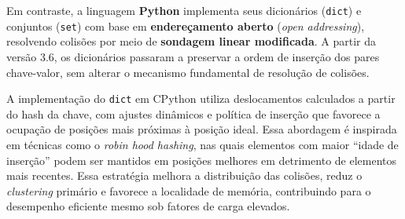 Em contraste, a linguagem \textbf{Python} implementa seus dicionários (\texttt{dict}) e conjuntos (\texttt{set}) com base em \textbf{endereçamento aberto} (\textit{open addressing}), resolvendo colisões por meio de \textbf{sondagem linear modificada}. 
A partir da versão 3.6, os dicionários passaram a preservar a ordem de inserção dos pares chave-valor, sem alterar o mecanismo fundamental de resolução de colisões.

A implementação do \texttt{dict} em CPython utiliza deslocamentos calculados a partir do hash da chave, com ajustes dinâmicos e política de inserção que favorece a ocupação de posições mais próximas à posição ideal. 
Essa abordagem é inspirada em técnicas como o \textit{robin hood hashing}, nas quais elementos com maior ``idade de inserção'' podem ser mantidos em posições melhores em detrimento de elementos mais recentes. 
Essa estratégia melhora a distribuição das colisões, reduz o \textit{clustering} primário e favorece a localidade de memória, contribuindo para o desempenho eficiente mesmo sob fatores de carga elevados.

